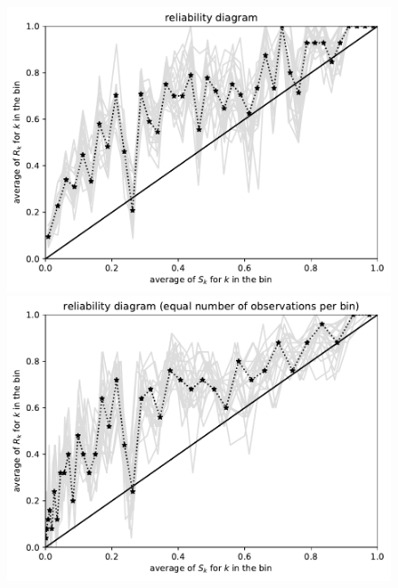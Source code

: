 \documentclass{article}
\begin{document}
\begin{figure}
\begin{centering}
\parbox{\imsize}{\includegraphics[width=\imsize]
                {./codes/unweighted/1000_40_1_2/equiprob.pdf}}
\quad\quad
\parbox{\imsize}{\includegraphics[width=\imsize]
                {./codes/unweighted/1000_40_1_2/equisamp.pdf}}

\vspace{\vertsep}


\end{centering}
\end{figure}
\end{document}
